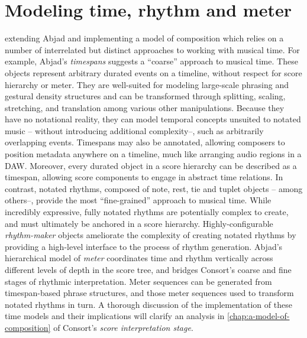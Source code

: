 \chapter{Modeling time, rhythm and meter}
\label{chap:time-tools}

\begin{comment}
<abjad>[hide=true]
import collections
import consort
</abjad>
\end{comment}

 extending Abjad and
implementing a model of composition which relies on a number of interrelated
but distinct approaches to working with musical time. For example, Abjad's
\emph{timespans} suggests a \enquote{coarse} approach to musical time. These
objects represent arbitrary durated events on a timeline, without respect for
score hierarchy or meter. They are well-suited for modeling large-scale
phrasing and gestural density structures and can be transformed through
splitting, scaling, stretching, and translation among various other
manipulations. Because they have no notational reality, they can model temporal
concepts unsuited to notated music -- without introducing additional
complexity--, such as arbitrarily overlapping events. Timespans may also be
annotated, allowing composers to position metadata anywhere on a timeline, much
like arranging audio regions in a DAW.\cite{curtis1996computer} Moreover, every
durated object in a score hierarchy can be described as a timespan, allowing
score components to engage in abstract time relations. In contrast, notated
rhythms, composed of note, rest, tie and tuplet objects -- among others--,
provide the most \enquote{fine-grained} approach to musical time. While
incredibly expressive, fully notated rhythms are potentially complex to create,
and must ultimately be anchored in a score hierarchy. Highly-configurable
\emph{rhythm-maker} objects ameliorate the complexity of creating notated
rhythms by providing a high-level interface to the process of rhythm
generation. Abjad's hierarchical model of \emph{meter} coordinates time and
rhythm vertically across different levels of depth in the score tree, and
bridges Consort's coarse and fine stages of rhythmic interpretation. Meter
sequences can be generated from timespan-based phrase structures, and those
meter sequences used to transform notated rhythms in turn. A thorough
discussion of the implementation of these time models and their implications
will clarify an analysis in \autoref{chap:a-model-of-composition} of Consort's
\emph{score interpretation stage}.

